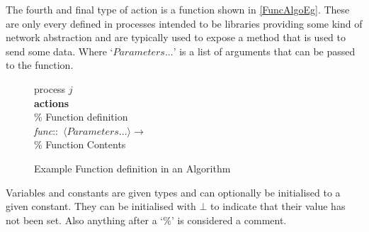The fourth and final type of action is a function shown in \autoref{FuncAlgoEg}. These are only every defined in processes intended to be libraries providing some kind of network abstraction and are typically used to expose a method that is used to send some data. Where `$Parameters...$' is a list of arguments that can be passed to the function.

\begin{figure}[H]
  \centering
  \begin{boxedminipage}{\linewidth}
    \null process $j$\\
    \null \textbf{actions}\\
    \null\qq \% Function definition\\
    \null\qq \emph{func}::~$\langle Parameters...\rangle \rightarrow$\\
    \null\qq\qq \% Function Contents\\
  \end{boxedminipage}
  \caption{Example Function definition in an Algorithm}
  \label{FuncAlgoEg}
\end{figure}


Variables and constants are given types and can optionally be initialised to a given constant. They can be initialised with $\bot$ to indicate that their value has not been set. Also anything after a `$\%$' is considered a comment.


